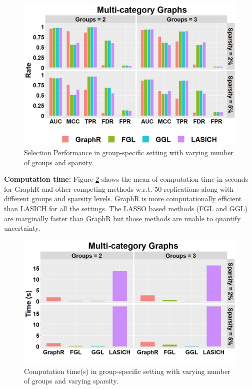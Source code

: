 \documentclass[
]{book}
\begin{document}
\begin{figure}

{\centering \includegraphics[width=0.9\linewidth]{images/group_specific_supp} 

}

\caption{Selection Performance in group-specific setting with varying number of groups and sparsity.}\label{fig:groupsele}
\end{figure}

\textbf{Computation time:}
Figure \ref{fig:grouptime} shows the mean of computation time in seconds for GraphR and other competing methods w.r.t. 50 replications along with different groups and sparsity levels. GraphR is more computationally efficient than LASICH for all the settings. The LASSO based methods (FGL and GGL) are marginally faster than GraphR but those methods are unable to quantify uncertainty.

\begin{figure}

{\centering \includegraphics[width=0.9\linewidth]{images/group_time} 

}

\caption{Computation time(s) in group-specific setting with varying number of groups and varying sparsity.}\label{fig:grouptime}
\end{figure}
\end{document}
